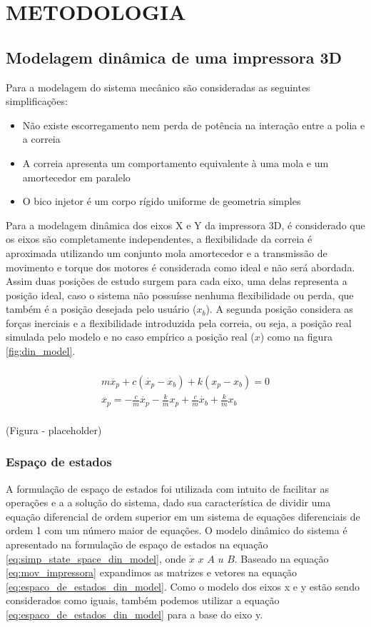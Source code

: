 \chapter{METODOLOGIA}

\section{Modelagem dinâmica de uma impressora 3D}
Para a modelagem do sistema mecânico são consideradas as seguintes simplificações:
\begin{itemize}
    \item Não existe escorregamento nem perda de potência na interação entre a polia e a correia
    \item A correia apresenta um comportamento equivalente à uma mola e um amortecedor em paralelo
    \item O bico injetor é um corpo rígido uniforme de geometria simples
\end{itemize}

Para a modelagem dinâmica dos eixos X e Y da impressora 3D, 
é considerado que os eixos são completamente independentes, 
a flexibilidade da correia é aproximada utilizando um conjunto 
mola amortecedor e a transmissão de movimento e torque dos 
motores é considerada como ideal e não será abordada.
Assim duas posições de estudo surgem para cada eixo, uma delas 
representa a posição ideal, caso o sistema não possuísse nenhuma flexibilidade
ou perda, que também é a posição desejada pelo usuário ($x_b$). 
A segunda posição considera as forças inerciais e a 
flexibilidade introduzida pela correia, ou seja, a posição real simulada pelo modelo
e no caso empírico a posição real ($x$) como na figura \ref{fig:din_model}.

\begin{multline}
    \label{eq:mov_impressora}
    \\
    m \ddot{x_p} + c(\dot{x_p} - \dot{x_b}) + k(x_p-x_b) = 0 \\
    \ddot{x_p} = - \frac{c}{m} \dot{x_p} - \frac{k}{m} x_p + \frac{c}{m} \dot{x_b} + \frac{k}{m} x_b \\
\end{multline}

(Figura - placeholder)

\subsection{Espaço de estados}
A formulação de espaço de estados foi utilizada com intuito de facilitar as operações e
a a solução do sistema, dado sua característica de dividir uma equação diferencial
de ordem superior em um sistema de equações diferenciais de ordem 1 com um número maior de equações.
O modelo dinâmico do sistema é apresentado na formulação de espaço de estados 
na equação \ref{eq:simp_state_space_din_model}, onde $\dot x$ $x$ $A$ $u$ $B$.
Baseado na equação \ref{eq:mov_impressora} expandimos as matrizes e vetores na equação 
\ref{eq:espaco_de_estados_din_model}.
Como o modelo dos eixos x e y estão sendo considerados como iguais, também podemos utilizar a equação 
\ref{eq:espaco_de_estados_din_model} para a base do eixo y.

